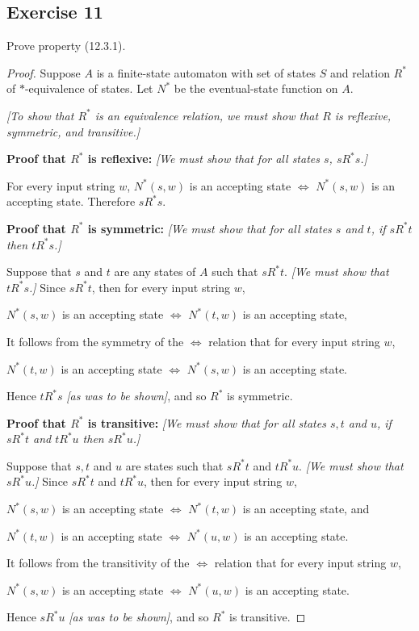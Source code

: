 \documentclass[14pt]{extarticle}
\begin{document}
\subsection{Exercise 11}
Prove property (12.3.1).
\begin{proof}
    Suppose \(A\) is a finite-state automaton with set of states \(S\) and relation \(R^*\) of \(*\)-equivalence of states.
    Let \(N^*\) be the eventual-state function on \(A\).

        {\it [To show that \(R^*\) is an equivalence relation, we must show that \(R\) is reflexive, symmetric, and transitive.]}

        {\bf Proof that \(R^*\) is reflexive:} {\it [We must show that for all states \(s\), \(sR^*s\).]}

    For every input string \(w\), \(N^*(s, w)\) is an accepting state \(\iff\) \(N^*(s, w)\) is an accepting state. Therefore
    \(sR^*s\).

        {\bf Proof that \(R^*\) is symmetric:} {\it [We must show that for all states \(s\) and \(t\), if \(sR^*t\) then \(tR^*s\).]}

    Suppose that \(s\) and \(t\) are any states of \(A\) such that \(sR^*t\). {\it [We must show that \(tR^*s\).]} Since
    \(sR^*t\), then for every input string \(w\),

    \(N^*(s, w)\) is an accepting state \(\iff\) \(N^*(t, w)\) is an accepting state,

    It follows from the symmetry of the \(\iff\) relation that for
    every input string \(w\),

    \(N^*(t, w)\) is an accepting state \(\iff\) \(N^*(s, w)\) is an accepting state.

    Hence \(tR^*s\) {\it [as was to be shown]}, and so \(R^*\) is symmetric.

        {\bf Proof that \(R^*\) is transitive:} {\it [We must show that for all states \(s, t\) and \(u\), if \(sR^*t\) and
                \(tR^*u\) then \(sR^*u\).]}

    Suppose that \(s, t\) and \(u\) are states such that \(sR^*t\) and \(tR^*u\). {\it [We must show that \(sR^*u\).]} Since
    \(sR^*t\) and \(tR^*u\), then for every input string \(w\),

    \(N^*(s, w)\) is an accepting state \(\iff\) \(N^*(t, w)\) is an accepting state, and

    \(N^*(t, w)\) is an accepting state \(\iff\) \(N^*(u, w)\) is an accepting state.

    It follows from the transitivity of the \(\iff\) relation that for every input string \(w\),

    \(N^*(s, w)\) is an accepting state \(\iff\) \(N^*(u, w)\) is an accepting state.

    Hence \(sR^*u\) {\it [as was to be shown]}, and so \(R^*\) is transitive.
\end{proof}
\end{document}
